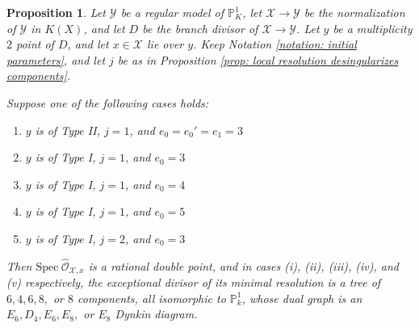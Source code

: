\documentclass[12pt]{amsart}
\numberwithin{equation}{section}
\newtheorem{prop}[equation]{Proposition}
\theoremstyle{definition}
\renewcommand{\O}{\mathcal{O}}
\renewcommand{\P}{\mathbb P}
\newcommand{\Spec}{\mathrm{Spec} \ }
\newcommand{\X}{\mathcal{X}}
\newcommand{\Y}{\mathcal{Y}}
\begin{document}
\begin{prop}\label{prop: rational double points}
    Let $\Y$ be a regular model of $\P^1_K$, let $\X\to\Y$ be the normalization of $\Y$ in $K(X)$, and let $D$ be the branch divisor of $\X\to\Y$. Let $y$ be a multiplicity $2$ point of $D$, and let $x\in\X$ lie over $y$. Keep Notation \ref{notation: initial parameters}, and let $j$ be as in Proposition \ref{prop: local resolution desingularizes components}.
    
    Suppose one of the following cases holds:
    \begin{enumerate}[\upshape (i)]
            \item $y$ is of Type II, $j=1$, and $e_0=e_0'=e_1=3$ 
            \item $y$ is of Type I, $j=1$, and $e_0=3$
            \item $y$ is of Type I, $j=1$, and $e_0=4$
            \item $y$ is of Type I, $j=1$, and $e_0=5$
            \item $y$ is of Type I, $j=2$, and $e_0=3$
    \end{enumerate}
    
    Then $\Spec\widehat{\O}_{\X,x}$ is a rational double point, and in cases \textup{(i)}, \textup{(ii)}, \textup{(iii)}, \textup{(iv)}, and \textup{(v)} respectively, the exceptional divisor of its minimal resolution is a tree of $6,4,6,8,$ or $8$ components, all isomorphic to $\P^1_k$, whose dual graph is an $E_6,D_4,E_6,E_8,$ or $E_8$ Dynkin diagram.
        
\end{prop}
\end{document}
